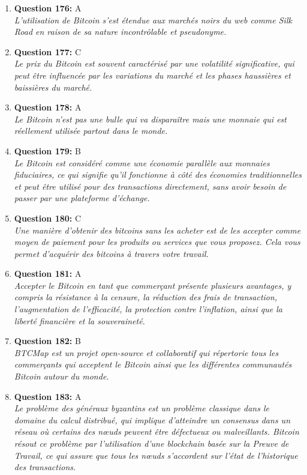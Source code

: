 \documentclass[12pt,a4paper]{article}
\begin{document}
\begin{enumerate}
\item \textbf{Question 176:} A
\\ \textit{L'utilisation de Bitcoin s'est étendue aux marchés noirs du web comme Silk Road en raison de sa nature incontrôlable et pseudonyme.}

\item \textbf{Question 177:} C
\\ \textit{Le prix du Bitcoin est souvent caractérisé par une volatilité significative, qui peut être influencée par les variations du marché et les phases haussières et baissières du marché.}

\item \textbf{Question 178:} A
\\ \textit{Le Bitcoin n'est pas une bulle qui va disparaître mais une monnaie qui est réellement utilisée partout dans le monde.}

\item \textbf{Question 179:} B
\\ \textit{Le Bitcoin est considéré comme une économie parallèle aux monnaies fiduciaires, ce qui signifie qu'il fonctionne à côté des économies traditionnelles et peut être utilisé pour des transactions directement, sans avoir besoin de passer par une plateforme d'échange.}

\item \textbf{Question 180:} C
\\ \textit{Une manière d'obtenir des bitcoins sans les acheter est de les accepter comme moyen de paiement pour les produits ou services que vous proposez. Cela vous permet d'acquérir des bitcoins à travers votre travail.}

\item \textbf{Question 181:} A
\\ \textit{Accepter le Bitcoin en tant que commerçant présente plusieurs avantages, y compris la résistance à la censure, la réduction des frais de transaction, l'augmentation de l'efficacité, la protection contre l'inflation, ainsi que la liberté financière et la souveraineté.}

\item \textbf{Question 182:} B
\\ \textit{BTCMap est un projet open-source et collaboratif qui répertorie tous les commerçants qui acceptent le Bitcoin ainsi que les différentes communautés Bitcoin autour du monde.}

\item \textbf{Question 183:} A
\\ \textit{Le problème des généraux byzantins est un problème classique dans le domaine du calcul distribué, qui implique d'atteindre un consensus dans un réseau où certains des nœuds peuvent être défectueux ou malveillants. Bitcoin résout ce problème par l'utilisation d'une blockchain basée sur la Preuve de Travail, ce qui assure que tous les nœuds s'accordent sur l'état de l'historique des transactions.}


\end{enumerate}
\end{document}
